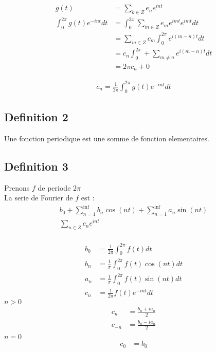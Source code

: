 \documentclass[a4paper,11pt]{article}
\begin{document}
\begin{align*}
  g(t) &= \sum_{k \in Z} e_{n}e^{int}\\
  \int_{0}^{2\pi} g(t)e^{-int} dt &= \int_{0}^{2x} \sum_{m \in Z} e_m e^{imt} e^{imt} dt \\
  &= \sum_{m \in Z} c_m \int_{0}^{2\pi} e^{i(m - n)t} dt\\
  &= c_n \int_{0}^{2\pi} + \sum_{m \neq n} e^{i(m-n)t} dt \\
  &= 2\pi c_n + 0
\end{align*}

\begin{align*}
  c_n = \frac{1}{2\pi} \int_0^{2\pi} g(t) e^{-int} dt
\end{align*}
\subsection{Definition 2}
Une fonction periodique est une somme de fonction elementaires.

\newpage
\subsection{Definition 3}
Prenons $f$ de periode $2\pi$\\
La serie de Fourier de $f$ est :\\

\begin{align*}
b_0 + \sum_{n = 1 }^{\inf} b_n  \cos(nt) + \sum_{n = 1}^{\inf} a_n \sin(nt)\\
\sum_{n \in Z} c_n e^{int}\\
\end{align*}

\begin{align*}
  b_0 &= \frac{1}{2\pi} \int_{0}^{2\pi} f(t) dt\\
  b_n &= \frac{1}{\pi} \int_{0}^{2\pi} f(t) \cos(nt)dt\\
  a_n &= \frac{1}{\pi} \int_0^{2\pi} f(t)\sin(nt) dt\\
  c_n &= \frac{1}{2\pi} f(t) e^{-int} dt
\end{align*}
$n > 0$ \\
\begin{align*}
  c_n &= \frac{b_n + i a_n}{2}\\
   c_{-n} &= \frac{b_n - i a_n}{2}\\
  \end{align*}
   $n = 0$\\
  \begin{align*}
 c_0 &= b_0
\end{align*}
\end{document}
